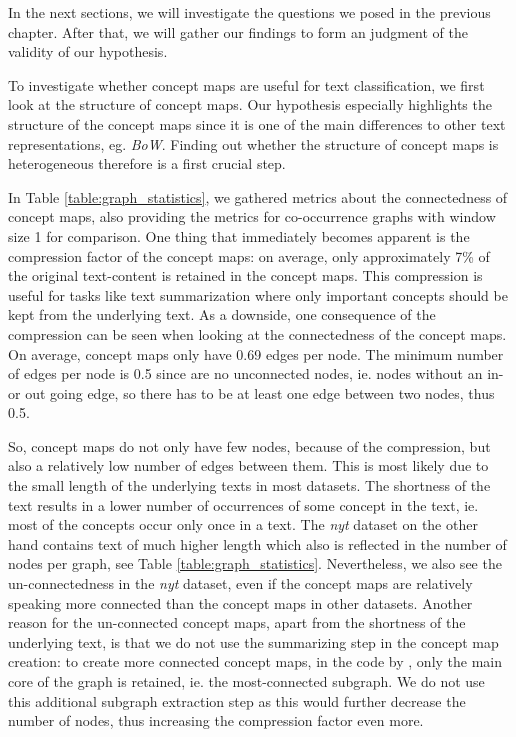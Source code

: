 In the next sections, we will investigate the questions we posed in the previous chapter.
After that, we will gather our findings to form an judgment of the validity of our hypothesis.


To investigate whether concept maps are useful for text classification, we first look at the structure of concept maps.
Our hypothesis especially highlights the structure of the concept maps since it is one of the main differences to other text representations, eg. \textit{BoW}.
Finding out whether the structure of concept maps is heterogeneous therefore is a first crucial step.

In Table \ref{table:graph_statistics}, we gathered metrics about the connectedness of concept maps, also providing the metrics for co-occurrence graphs with window size 1 for comparison.
One thing that immediately becomes apparent is the compression factor of the concept maps: on average, only approximately 7\% of the original text-content is retained in the concept maps.
This compression is useful for tasks like text summarization where only important concepts should be kept from the underlying text.
As a downside, one consequence of the compression can be seen when looking at the connectedness of the concept maps.
On average, concept maps only have 0.69 edges per node. The minimum number of edges per node is 0.5 since are no unconnected nodes, ie. nodes without an in- or out going edge, so there has to be at least one edge between two nodes, thus 0.5.

So, concept maps do not only have few nodes, because of the compression, but also a relatively low number of edges between them.
This is most likely due to the small length of the underlying texts in most datasets.
The shortness of the text results in a lower number of occurrences of some concept in the text, ie. most of the concepts occur only once in a text.
The \textit{nyt} dataset on the other hand contains text of much higher length which also is reflected in the number of nodes per graph, see Table \ref{table:graph_statistics}.
Nevertheless, we also see the un-connectedness in the \textit{nyt} dataset, even if the concept maps are relatively speaking more connected than the concept maps in other datasets.
Another reason for the un-connected concept maps, apart from the shortness of the underlying text, is that we do not use the summarizing step in the concept map creation: to create more connected concept maps, in the code by \cite{Falke2017b}, only the main core of the graph is retained, ie. the  most-connected subgraph.
We do not use this additional subgraph extraction step as this would further decrease the number of nodes, thus increasing the compression factor even more.

